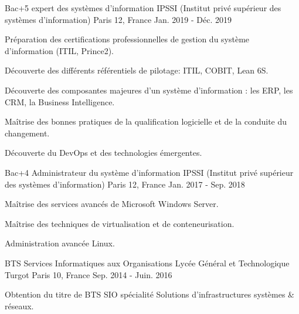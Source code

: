 

\begin{cventries}

  \cventry
    {Bac+5 expert des systèmes d'information} %
    {IPSSI (Institut privé supérieur des systèmes d'information)} %
    {Paris 12, France} %
    {Jan. 2019 - Déc. 2019} %
    {
      \begin{cvitems} %
        \item {Préparation des certifications professionnelles de gestion du système d'information (ITIL, Prince2).}
        \item {Découverte des différents référentiels de pilotage: ITIL, COBIT, Lean 6S.}
        \item {Découverte des composantes majeures d'un système d'information : les ERP, les CRM, la Business Intelligence.}
        \item {Maîtrise des bonnes pratiques de la qualification logicielle et de la conduite du changement.}
        \item {Découverte du DevOps et des technologies émergentes.}
      \end{cvitems}
    }

  \cventry
    {Bac+4 Administrateur du système d'information} %
    {IPSSI (Institut privé supérieur des systèmes d'information)} %
    {Paris 12, France} %
    {Jan. 2017 - Sep. 2018} %
    {
      \begin{cvitems} %
        \item {Maîtrise des services avancés de Microsoft Windows Server.}
        \item {Maîtrise des techniques de virtualisation et de conteneurisation.}
        \item {Administration avancée Linux.}
      \end{cvitems}
  }

  \cventry
    {BTS Services Informatiques aux Organisations} %
    {Lycée Général et Technologique Turgot} %
    {Paris 10, France} %
    {Sep. 2014 - Juin. 2016} %
    {
      \begin{cvitems} %
        \item {Obtention du titre de BTS SIO spécialité Solutions d'infrastructures systèmes \& réseaux.}
      \end{cvitems}
  }

\end{cventries}
